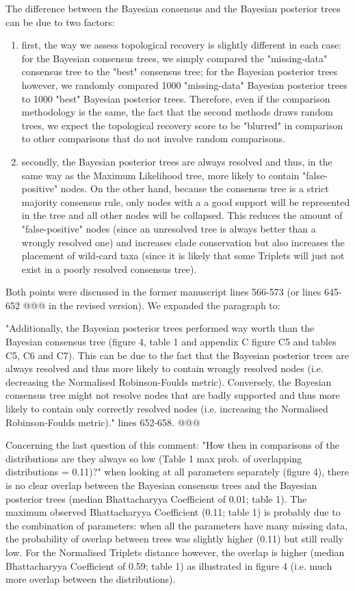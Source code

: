 \documentclass[12pt,letterpaper]{article}
\begin{document}
\begin{enumerate}
The difference between the Bayesian consensus and the Bayesian posterior trees can be due to two factors:
\begin{enumerate}
\item first, the way we assess topological recovery is slightly different in each case: for the Bayesian consensus trees, we simply compared the "missing-data" consensus tree to the "best" consensus tree; for the Bayesian posterior trees however, we randomly compared 1000 "missing-data" Bayesian posterior trees to 1000 "best" Bayesian posterior trees.
Therefore, even if the comparison methodology is the same, the fact that the second methods draws random trees, we expect the topological recovery score to be "blurred" in comparison to other comparisons that do not involve random comparisons.
\item secondly, the Bayesian posterior trees are always resolved and thus, in the same way as the Maximum Likelihood tree, more likely to contain "false-positive" nodes. On the other hand, because the consensus tree is a strict majority consensus rule, only nodes with a a good support will be represented in the tree and all other nodes will be collapsed. This reduces the amount of "false-positive" nodes (since an unresolved tree is always better than a wrongly resolved one) and increases clade conservation but also increases the placement of wild-card taxa (since it is likely that some Triplets will just not exist in a poorly resolved consensus tree).
\end{enumerate}
Both points were discussed in the former manuscript lines 566-573 (or lines 645-652 @@@ in the revised version).
We expanded the paragraph to:

"Additionally, the Bayesian posterior trees performed way worth than the Bayesian consensus tree (figure 4, table 1 and appendix C figure C5 and tables C5, C6 and C7).
This can be due to the fact that the Bayesian posterior trees are always resolved and thus more likely to contain wrongly resolved nodes (i.e. decreasing the Normalised Robinson-Foulds metric).
Conversely, the Bayesian consensus tree might not resolve nodes that are badly supported and thus more likely to contain only correctly resolved nodes (i.e. increasing the Normalised Robinson-Foulds metric)." lines 652-658. @@@

Concerning the last question of this comment: "How then in comparisons of the distributions are they always so low (Table 1 max prob. of overlapping distributions = 0.11)?" when looking at all parameters separately (figure 4), there is no clear overlap between the Bayesian consensus trees and the Bayesian posterior trees (median Bhattacharyya Coefficient of 0.01; table 1).
The maximum observed Bhattacharyya Coefficient (0.11; table 1) is probably due to the combination of parameters: when all the parameters have many missing data, the probability of overlap between trees was slightly higher (0.11) but still really low.
For the Normalised Triplets distance however, the overlap is higher (median Bhattacharyya Coefficient of 0.59; table 1) as illustrated in figure 4 (i.e. much more overlap between the distributions).


\end{enumerate}
\end{document}
